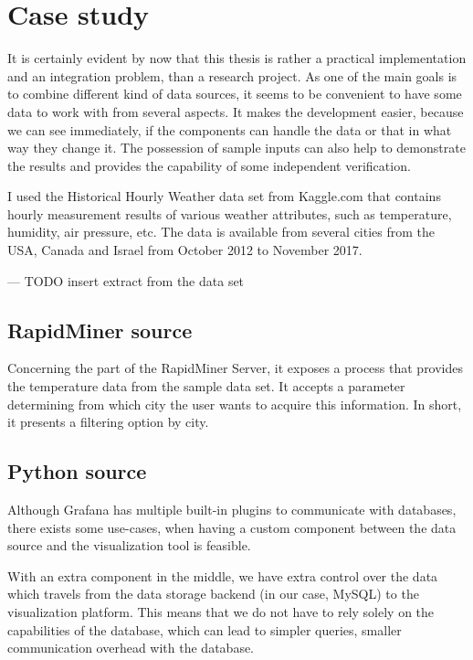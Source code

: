 \chapter{Case study}

It is certainly evident by now that this thesis is rather a practical implementation and an integration problem, than a research project. As one of the main goals is to combine different kind of data sources, it seems to be convenient to have some data to work with from several aspects. It makes the development easier, because we can see immediately, if the components can handle the data or that in what way they change it. The possession of sample inputs can also help to demonstrate the results and provides the capability of some independent verification.

I used the Historical Hourly Weather data set from Kaggle.com that contains hourly measurement results of various weather attributes, such as temperature, humidity, air pressure, etc. The data is available from several cities from the USA, Canada and Israel from October 2012 to November 2017.

\begin{center}
	--- TODO insert extract from the data set
\end{center}

\section{RapidMiner source}

Concerning the part of the RapidMiner Server, it exposes a process that provides the temperature data from the sample data set. It accepts a parameter determining from which city the user wants to acquire this information. In short, it presents a filtering option by city.

\section{Python source} \label{case-study-python-source}

Although Grafana has multiple built-in plugins to communicate with databases, there exists some use-cases, when having a custom component between the data source and the visualization tool is feasible.

With an extra component in the middle, we have extra control over the data which travels from the data storage backend (in our case, MySQL) to the visualization platform. This means that we do not have to rely solely on the capabilities of the database, which can lead to simpler queries, smaller communication overhead with the database.

